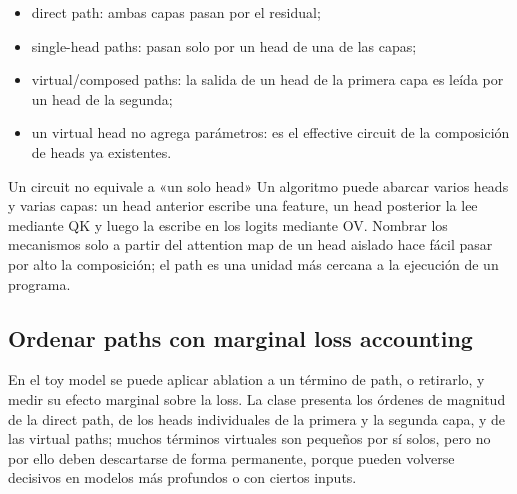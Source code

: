 \begin{itemize}
  \item direct path: ambas capas pasan por el residual;
  \item single-head paths: pasan solo por un head de una de las capas;
  \item virtual/composed paths: la salida de un head de la primera capa es leída por un head de la segunda;
  \item un virtual head no agrega parámetros: es el effective circuit de la composición de heads ya existentes.
\end{itemize}



\begin{importantbox}{Un circuit no equivale a «un solo head»}
Un algoritmo puede abarcar varios heads y varias capas: un head anterior escribe una feature, un head posterior la lee mediante QK y luego la escribe en los logits mediante OV. Nombrar los mecanismos solo a partir del attention map de un head aislado hace fácil pasar por alto la composición; el path es una unidad más cercana a la ejecución de un programa.
\end{importantbox}

\subsection{Ordenar paths con marginal loss accounting}

En el toy model se puede aplicar ablation a un término de path, o retirarlo, y medir su efecto marginal sobre la loss. La clase presenta los órdenes de magnitud de la direct path, de los heads individuales de la primera y la segunda capa, y de las virtual paths; muchos términos virtuales son pequeños por sí solos, pero no por ello deben descartarse de forma permanente, porque pueden volverse decisivos en modelos más profundos o con ciertos inputs.


